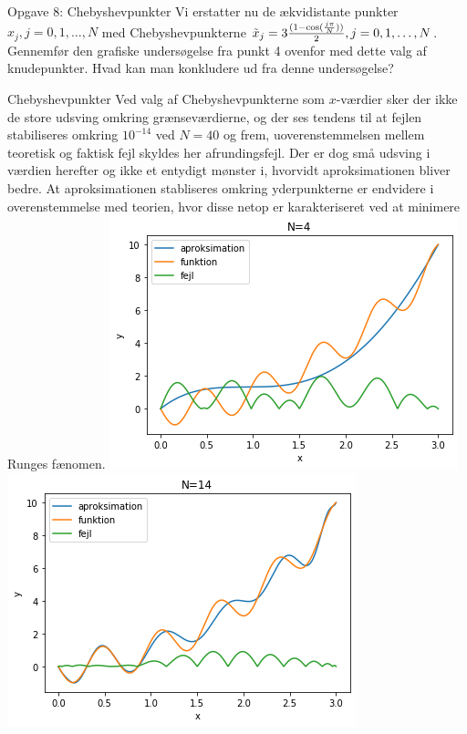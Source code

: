 \begin{frame}{Opgave 8: Chebyshevpunkter}
    Vi erstatter nu de ækvidistante punkter $x_j , j = 0, 1, \ldots , N$ med Chebyshevpunkterne $\Tilde{x}_j = 3 \frac{(1 -\cos(\frac{j \pi}{N}))}{2}, j = 0, 1, \ldots , N$. 
    Gennemfør den grafiske undersøgelse fra punkt 4 ovenfor med dette valg af knudepunkter. 
    Hvad kan man konkludere ud fra denne undersøgelse?
\end{frame}

\begin{frame}{Chebyshevpunkter}
    Ved valg af Chebyshevpunkterne som $x$-værdier sker der ikke de store udsving omkring grænseværdierne, og der ses tendens til at fejlen stabiliseres omkring $10^{{-14}}$ ved $N=40$ og frem, uoverenstemmelsen mellem teoretisk og faktisk fejl skyldes her afrundingsfejl. 
    Der er dog små udsving i værdien herefter og ikke et entydigt mønster i, hvorvidt aproksimationen bliver bedre.
    At aproksimationen stabliseres omkring yderpunkterne er endvidere i overenstemmelse med teorien, hvor disse netop er karakteriseret ved at minimere Runges fænomen.
   \includegraphics[scale=0.40]{Images/chev_N=4.png}
   \includegraphics[scale=0.40]{Images/Chev_N=14.png}
\end{frame}